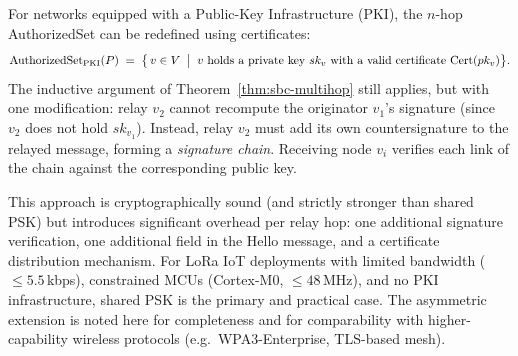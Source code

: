 
\begin{remark}
\label{rem:pki-alternative}
For networks equipped with a Public-Key Infrastructure (PKI), the
$n$-hop AuthorizedSet can be redefined using certificates:
\[
  \mathrm{AuthorizedSet}_{\mathrm{PKI}}(P)
  \;=\;
  \bigl\{\, v \in V \;\bigm|\;
    v \text{ holds a private key } sk_v
    \text{ with a valid certificate } \mathrm{Cert}(pk_v)
  \bigr\}.
\]
The inductive argument of Theorem~\ref{thm:sbc-multihop} still applies,
but with one modification: relay $v_2$ cannot recompute the originator
$v_1$'s signature (since $v_2$ does not hold $sk_{v_1}$).
Instead, relay $v_2$ must add its own countersignature to the relayed
message, forming a \emph{signature chain}.
Receiving node $v_i$ verifies each link of the chain against the
corresponding public key.

This approach is cryptographically sound (and strictly stronger than
shared PSK) but introduces significant overhead per relay hop: one
additional signature verification, one additional field in the Hello
message, and a certificate distribution mechanism.
For LoRa IoT deployments with limited bandwidth
($\le 5.5$\,kbps), constrained MCUs (Cortex-M0, $\le 48$\,MHz), and
no PKI infrastructure, shared PSK is the primary and practical case.
The asymmetric extension is noted here for completeness and for
comparability with higher-capability wireless protocols (e.g.\
WPA3-Enterprise, TLS-based mesh).
\end{remark}
